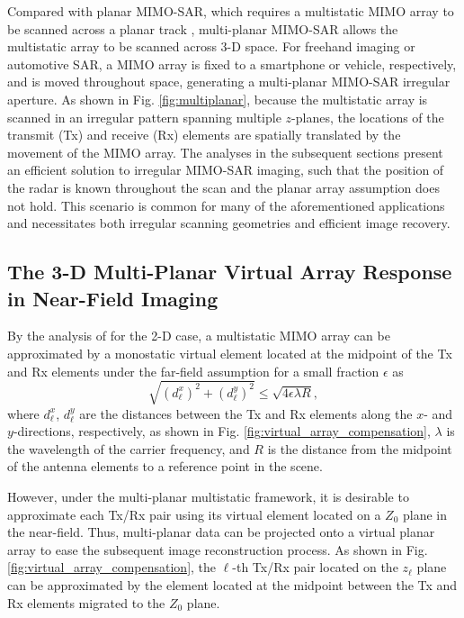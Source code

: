 \documentclass{ieeeaccess}
\begin{document}
Compared with planar MIMO-SAR, which requires a multistatic MIMO array to be scanned across a planar track \cite{yanik2020development,yanik2019sparse,fan2020linearMIMOArbitraryTopologies}, multi-planar MIMO-SAR allows the multistatic array to be scanned across \mbox{3-D} space. 
For freehand imaging or automotive SAR, a MIMO array is fixed to a smartphone or vehicle, respectively, and is moved throughout space, generating a multi-planar MIMO-SAR irregular aperture. 
As shown in Fig. \ref{fig:multiplanar}, because the multistatic array is scanned in an irregular pattern spanning multiple $z$-planes, the locations of the transmit (Tx) and receive (Rx) elements are spatially translated by the movement of the MIMO array. 
The analyses in the subsequent sections present an efficient solution to irregular MIMO-SAR imaging, such that the position of the radar is known throughout the scan and the planar array assumption does not hold. 
This scenario is common for many of the aforementioned applications and necessitates both irregular scanning geometries and efficient image recovery.

\subsection{The \mbox{3-D} Multi-Planar Virtual Array Response in Near-Field Imaging}
\label{subsec:virtual_array}
By the analysis of \cite{yanik2019sparse,smith2022ThzToolbox,ender2009systemMIMOSAR} for the \mbox{2-D} case, a multistatic MIMO array can be approximated by a monostatic virtual element located at the midpoint of the Tx and Rx elements under the far-field assumption for a small fraction $\epsilon$ as 
\begin{equation}
\label{eq:far_field_assumption}
    \sqrt{(d_\ell^x)^2 + (d_\ell^y)^2} \leq \sqrt{4 \epsilon \lambda R},
\end{equation}
where $d_\ell^x$, $d_\ell^y$ are the distances between the Tx and Rx elements along the $x$- and $y$-directions, respectively, as shown in Fig. \ref{fig:virtual_array_compensation}, $\lambda$ is the wavelength of the carrier frequency, and $R$ is the distance from the midpoint of the antenna elements to a reference point in the scene. 

However, under the multi-planar multistatic framework, it is desirable to approximate each Tx/Rx pair using its virtual element located on a $Z_0$ plane in the near-field.
Thus, multi-planar data can be projected onto a virtual planar array to ease the subsequent image reconstruction process.
As shown in Fig. \ref{fig:virtual_array_compensation}, the $\ell$-th Tx/Rx pair located on the $z_\ell$ plane can be approximated by the element located at the midpoint between the Tx and Rx elements migrated to the $Z_0$ plane.
\end{document}
